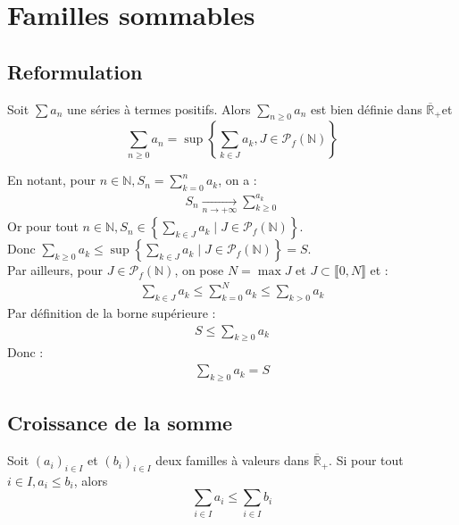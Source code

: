\documentclass[../main.tex]{subfiles}
\begin{document}
\setcounter{chapter}{34}
\chapter{Familles sommables}
\tableofcontents
\clearpage

\section{Reformulation}
\begin{tcolorbox}[title=Propostion 35.2, title filled=false, colframe=lightblue, colback=lightblue!10!white]
    Soit $\sum a_n$ une séries à termes positifs. Alors $\sum_{n \geq 0} a_n$ est bien définie dans $\overline{\mathbb{R}}_{+}$et
    $$\sum_{n \geq 0} a_n=\sup \left\{\sum_{k \in J} a_k, J \in \mathcal{P}_f(\mathbb{N})\right\}$$
\end{tcolorbox}

\noindent En notant, pour $n\in \mathbb{N}, S_n = \sum\limits_{k=0}^{n} a_k$, on a : 
\begin{align*}
    S_n \underset{n \to +\infty}{\longrightarrow} \sum_{k\geq 0}^{a_k} 
\end{align*}
Or pour tout $n\in \mathbb{N}, S_n\in \left\{ \sum_{k\in J} a_k\mid J\in \mathcal{P}_f(\mathbb{N}) \right\}$. \\
Donc $\sum_{k\geq 0} a_k \leq \sup \left\{ \sum_{k\in J} a_k\mid J\in \mathcal{P}_f(\mathbb{N}) \right\} = S$. \\
Par ailleurs, pour $J\in \mathcal{P}_f(\mathbb{N})$, on pose $N = \max J$ et $J\subset \llbracket 0, N \rrbracket$ et : 
\begin{align*}
    \sum_{k\in J} a_k  \leq \sum_{k=0}^{N} a_k \leq \sum_{k>0} a_k 
\end{align*}
Par définition de la borne supérieure : 
\begin{align*}
    S \leq \sum_{k\geq 0} a_k
\end{align*}
Donc : 
\begin{align*}
    \sum_{k\geq 0} a_k = S
\end{align*}

\section{Croissance de la somme}
\begin{tcolorbox}[title=Propostion 35.5, title filled=false, colframe=lightblue, colback=lightblue!10!white]
    Soit $\left(a_i\right)_{i \in I}$ et $\left(b_i\right)_{i \in I}$ deux familles à valeurs dans $\overline{\mathbb{R}}_{+}$. Si pour tout $i \in I, a_i \leq b_i$, alors
    $$\sum_{i \in I} a_i \leq \sum_{i \in I} b_i$$
\end{tcolorbox}
\end{document}
